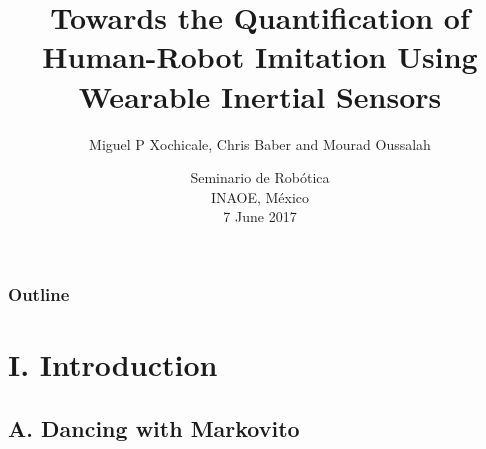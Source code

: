 \documentclass{beamer}
\title[]
{Towards the Quantification of \\
Human-Robot Imitation Using Wearable Inertial Sensors}
\author[Miguel P Xochicale]
{   %
    Miguel P Xochicale\inst{1}, Chris Baber\inst{1} and Mourad Oussalah\inst{2}
}
\institute[CVC-IIIA]
{   %

      \vspace{5mm}
    \begin{tabular}{c}
    \inst{1} School of Engineering, University of Birmingham, UK \\
    \inst{2} Center for Ubiquitous Computing, University of Oulu, Finland
    \end{tabular}
}
\date[DEMO-2013]
{   %
      \vspace{5mm}
     Seminario de Rob\'otica \\
     INAOE, M\'exico \\
     7 June 2017
}
\begin{document}
\frame{\titlepage}%





\begin{frame}
\frametitle{Outline}
\tableofcontents
\end{frame}




\section{I. Introduction}




\subsection{A. Dancing with Markovito}
\end{document}
